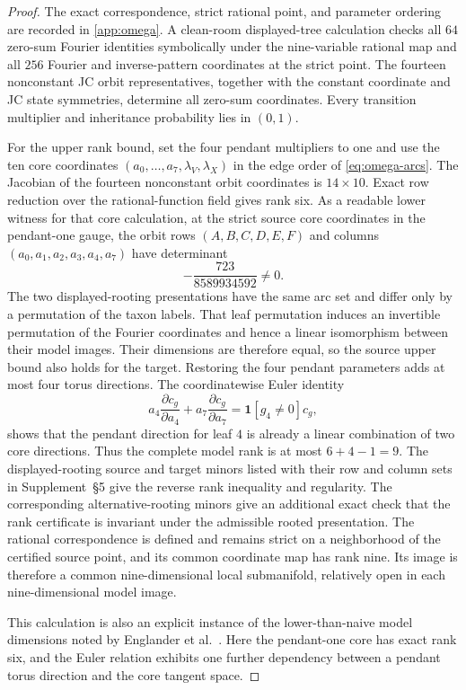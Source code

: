 \documentclass[11pt]{article}
\theoremstyle{remark}
\begin{document}
\begin{proof}
The exact correspondence, strict rational point, and parameter ordering are
recorded in \cref{app:omega}.  A clean-room displayed-tree calculation checks
all $64$ zero-sum Fourier identities symbolically under the nine-variable
rational map and all $256$ Fourier and inverse-pattern coordinates at the
strict point.  The fourteen nonconstant JC orbit representatives, together
with the constant coordinate and JC state symmetries, determine all zero-sum
coordinates.  Every transition multiplier and inheritance probability lies
in $(0,1)$.

For the upper rank bound, set the four pendant multipliers to one and use the
ten core coordinates $(a_0,\ldots,a_7,\lambda_V,\lambda_X)$ in the edge order
of \eqref{eq:omega-arcs}.  The Jacobian of the fourteen nonconstant orbit
coordinates is $14\times10$.  Exact row reduction over the rational-function
field gives rank six.  As a readable lower witness for that core calculation,
at the strict source core coordinates in the pendant-one gauge, the orbit
rows $(A,B,C,D,E,F)$ and columns
$(a_0,a_1,a_2,a_3,a_4,a_7)$ have determinant
\[
-\frac{723}{8589934592}\ne0.
\]
The two displayed-rooting presentations have the same arc set and differ
only by a permutation of the taxon labels.  That leaf permutation induces an
invertible permutation of the Fourier coordinates and hence a linear
isomorphism between their model images.  Their dimensions are therefore
equal, so the source upper bound also holds for the target.  Restoring the four pendant
parameters adds at most four torus directions.  The coordinatewise Euler
identity
\[
a_4\frac{\partial c_g}{\partial a_4}
+a_7\frac{\partial c_g}{\partial a_7}
=\mathbf1[g_4\ne0]c_g,
\]
shows that the pendant direction for leaf $4$ is already a linear combination
of two core directions.  Thus the complete model rank is at most
$6+4-1=9$.  The displayed-rooting source and target minors listed with their
row and column sets in Supplement~\S5 give the reverse rank inequality and
regularity.  The corresponding alternative-rooting minors give an additional
exact check that the rank certificate is invariant under the admissible
rooted presentation.
The rational correspondence is defined and remains strict on a neighborhood
of the certified source point, and its common coordinate map has rank nine.
Its image is therefore a common nine-dimensional local submanifold,
relatively open in each nine-dimensional model image.

This calculation is also an explicit instance of the lower-than-naive model
dimensions noted by Englander et al.~\cite[Discussion]{EnglanderEtAl2026}.
Here the pendant-one core has exact rank six, and the Euler relation exhibits
one further dependency between a pendant torus direction and the core tangent
space.
\end{proof}
\end{document}
